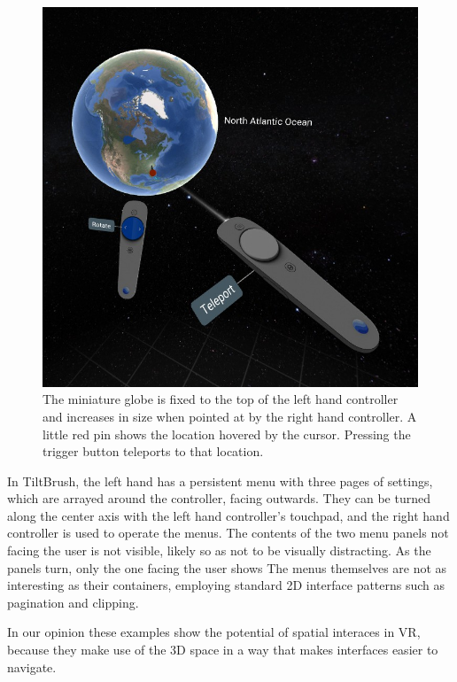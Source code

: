 \documentclass{tufte-book} %
\begin{document}
\begin{figure}
  \includegraphics{globe.png}
  \caption{The miniature globe is fixed to the top of the left hand controller and increases in size when pointed at by the right hand controller. A little red pin shows the location hovered by the cursor. Pressing the trigger button teleports to that location.}
  \label{fig:globe}
\end{figure}

In TiltBrush, the left hand has a persistent menu with three pages of settings, which are arrayed around the controller, facing outwards. They can be turned along the center axis with the left hand controller's touchpad, and the right hand controller is used to operate the menus.
The contents of the two menu panels not facing the user is not visible, likely so as not to be visually distracting. As the panels turn, only the one facing the user shows
The menus themselves are not as interesting as their containers, employing standard 2D interface patterns such as pagination and clipping.

In our opinion these examples show the potential of spatial interaces in VR, because they make use of the 3D space in a way that makes interfaces easier to navigate.
\end{document}
